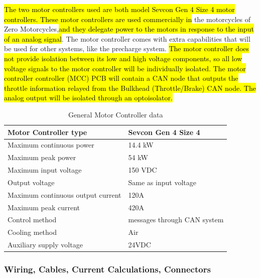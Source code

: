 \documentclass{article}
\DeclareRobustCommand{\hlr}[1]{{\sethlcolor{red}\hl{#1}}}
\begin{document}
            \hlr{The two motor controllers used are both model Sevcon Gen 4 Size 4 motor controllers. These motor controllers are used commercially in} the motorcycles of Zero Motorcycles,\hlr{and they delegate power to the motors in response to the input of an analog signal}. The motor controller comes with extra capabilities that will be used for other systems, like the precharge system. \hlr{The motor controller does not provide isolation between its low and high voltage components, so all low voltage signals to the motor controller will be individually isolated. The motor controller controller (MCC) PCB will contain a CAN node that outputs the throttle information relayed from the Bulkhead (Throttle/Brake) CAN node. The analog output will be isolated through an optoisolator.}

            \begin{table}[H]
            \centering
            \begin{tabular}{|l|l|}
            \hline
            Motor Controller type & Sevcon Gen 4 Size 4 \\ \hline
            Maximum continuous power & 14.4 kW \\ \hline
            Maximum peak power & 54 kW \\ \hline
            Maximum input voltage & 150 VDC \\ \hline
            Output voltage & Same as input voltage \\ \hline
            Maximum continuous output current & 120A \\ \hline
            Maximum peak current & 420A \\ \hline
            Control method & messages through CAN system \\ \hline
            Cooling method & Air \\ \hline
            Auxiliary supply voltage & 24VDC \\ \hline
            \end{tabular}
            \caption{General Motor Controller data}
            \label{MC}
            \end{table}

        \subsubsection{Wiring, Cables, Current Calculations, Connectors} \label{mcwire}

\end{document}
